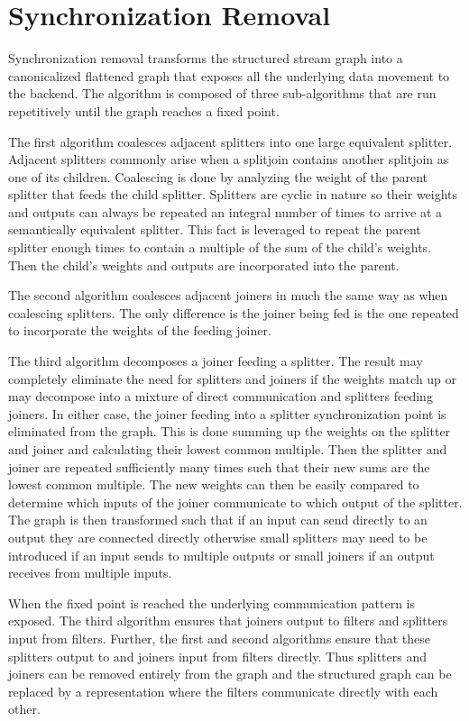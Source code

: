 \section{Synchronization Removal}
\label{sec:synchremoval}

Synchronization removal transforms the structured stream graph into a
canonicalized flattened graph that exposes all the underlying data
movement to the backend. The algorithm is composed of three
sub-algorithms that are run repetitively until the graph reaches a
fixed point.

The first algorithm coalesces adjacent splitters into one large
equivalent splitter. Adjacent splitters commonly arise when a
splitjoin contains another splitjoin as one of its
children. Coalescing is done by analyzing the weight of the parent
splitter that feeds the child splitter. Splitters are cyclic in nature
so their weights and outputs can always be repeated an integral number
of times to arrive at a semantically equivalent splitter. This fact is
leveraged to repeat the parent splitter enough times to contain a
multiple of the sum of the child's weights. Then the child's weights
and outputs are incorporated into the parent.

The second algorithm coalesces adjacent joiners in much the same way
as when coalescing splitters. The only difference is the joiner being
fed is the one repeated to incorporate the weights of the feeding joiner.

The third algorithm decomposes a joiner feeding a splitter. The result
may completely eliminate the need for splitters and joiners if the weights
match up or may decompose into a mixture of direct communication and
splitters feeding joiners. In either case, the joiner feeding into a
splitter synchronization point is eliminated from the graph. This is
done summing up the weights on the splitter and joiner and calculating
their lowest common multiple. Then the splitter and joiner are
repeated sufficiently many times such that their new sums are the lowest
common multiple. The new weights can then be easily compared to
determine which inputs of the joiner communicate to which output of
the splitter. The graph is then transformed such that if an input can
send directly to an output they are connected directly otherwise small
splitters may need to be introduced if an input sends to multiple
outputs or small joiners if an output receives from multiple inputs.

When the fixed point is reached the underlying communication pattern
is exposed. The third algorithm ensures that joiners output to filters
and splitters input from filters. Further, the first and second
algorithms ensure that these splitters output to and joiners input
from filters directly. Thus splitters and joiners can be removed
entirely from the graph and the structured graph can be replaced by a
representation where the filters communicate directly with each other.